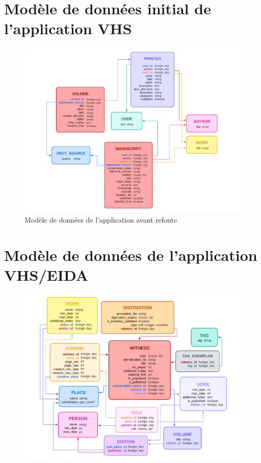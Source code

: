 \section{Modèle de données initial de l'application VHS}
	\begin{figure}[H]
		\centering
		\includegraphics[width=16cm]{images/vhs_data_model.png}
		\caption{Modèle de données de l'application \vhs avant refonte}
		\label{fig:vhs_data_model}
	\end{figure}

\section{Modèle de données de l'application VHS/EIDA}
	\begin{figure}[H]
		\centering
		\includegraphics[width=16cm]{images/eida_data_model.png}
		\label{fig:eida_data_model}
	\end{figure}